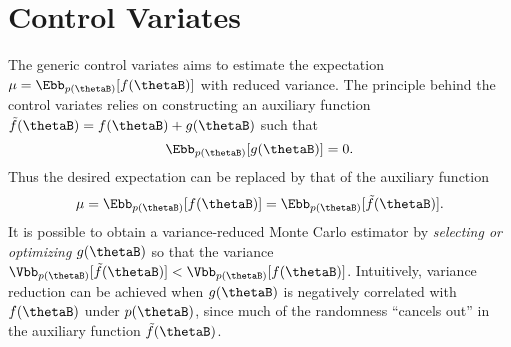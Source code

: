 \documentclass[runningheads]{llncs}
\begin{document}
\section{Control Variates}
\label{sec:cv}
The generic control variates aims to estimate the expectation $\mu = \Ebb_{p(\thetaB)} [f(\thetaB)]$ with reduced variance. The principle behind the control variates relies on constructing an auxiliary function $\tilde{f}(\thetaB) = f(\thetaB) + g(\thetaB)$ such that
\begin{equation}
\Ebb_{p(\thetaB)} [g(\thetaB)] = 0.
\end{equation}
Thus the desired expectation can be replaced by that of the auxiliary function
\begin{equation}
\mu = \Ebb_{p(\thetaB)} [f(\thetaB)] = \Ebb_{p(\thetaB)} [\tilde{f}(\thetaB)].
\end{equation}
It is possible to obtain a variance-reduced Monte Carlo estimator by \emph{selecting or optimizing} $g(\thetaB)$ 
so that the variance $\Vbb_{p(\thetaB)} [\tilde{f}(\thetaB)] < \Vbb_{p(\thetaB)} [f(\thetaB)]$. Intuitively,  variance reduction can be achieved 
when $g(\thetaB)$ is negatively correlated with $f(\thetaB)$ under $p(\thetaB)$, since much of the randomness “cancels out” in the auxiliary function $\tilde{f}(\thetaB)$. 
\end{document}
